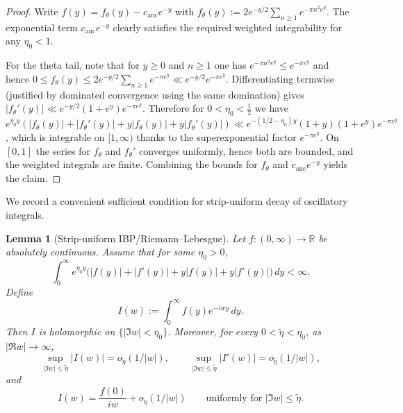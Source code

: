 \documentclass[11pt]{amsart}
\newtheorem{lemma}[theorem]{Lemma}
\theoremstyle{definition}
\theoremstyle{remark}
\newcommand{\R}{\mathbb{R}}
\begin{document}
\begin{proof}
Write $f(y)=f_{\theta}(y)-c_{\mathrm{anc}}e^{-y}$ with $f_{\theta}(y):=2e^{-y/2}\sum_{n\ge1}e^{-\pi n^2 e^y}$.
The exponential term $c_{\mathrm{anc}}e^{-y}$ clearly satisfies the required weighted integrability for any
$\eta_0<1$.

For the theta tail, note that for $y\ge0$ and $n\ge1$ one has
$e^{-\pi n^2 e^y}\le e^{-\pi e^y}$ and hence
$0\le f_{\theta}(y)\le 2e^{-y/2}\sum_{n\ge1}e^{-\pi e^y}\ll e^{-y/2}e^{-\pi e^y}$.
Differentiating termwise (justified by dominated convergence using the same domination) gives
$|f_{\theta}'(y)|\ll e^{-y/2}(1+e^y)e^{-\pi e^y}$.
Therefore for $0<\eta_0<\tfrac12$ we have
$e^{\eta_0 y}(|f_{\theta}(y)|+|f_{\theta}'(y)|+y|f_{\theta}(y)|+y|f_{\theta}'(y)|)\ll
e^{-(1/2-\eta_0)y}(1+y)(1+e^y)e^{-\pi e^y}$,
which is integrable on $[1,\infty)$ thanks to the superexponential factor $e^{-\pi e^y}$.
On $[0,1]$ the series for $f_{\theta}$ and $f_{\theta}'$ converges uniformly, hence both are bounded,
and the weighted integrals are finite. Combining the bounds for $f_{\theta}$ and $c_{\mathrm{anc}}e^{-y}$
yields the claim.
\end{proof}

We record a convenient sufficient condition for strip-uniform decay of oscillatory integrals.

\begin{lemma}[Strip-uniform IBP/Riemann--Lebesgue]\label{lem:strip-RL}
Let $f:(0,\infty)\to\R$ be absolutely continuous. Assume that for some $\eta_0>0$,
\[
\int_0^\infty e^{\eta_0 y}\bigl(|f(y)|+|f'(y)|+y|f(y)|+y|f'(y)|\bigr)\,dy<\infty.
\]
Define
\[
I(w):=\int_0^\infty f(y)e^{-iwy}\,dy.
\]
Then $I$ is holomorphic on $\{|\Im w|<\eta_0\}$. Moreover, for every $0<\tilde\eta<\eta_0$, as $|\Re w|\to\infty$,
\[
\sup_{|\Im w|\le \tilde\eta}|I(w)|=o_{\tilde\eta}(1/|w|),\qquad
\sup_{|\Im w|\le \tilde\eta}|I'(w)|=o_{\tilde\eta}(1/|w|),
\]
and
\[
I(w)=\frac{f(0)}{iw}+o_{\tilde\eta}(1/|w|)
\qquad\text{uniformly for }|\Im w|\le \tilde\eta.
\]
\end{lemma}
\end{document}
